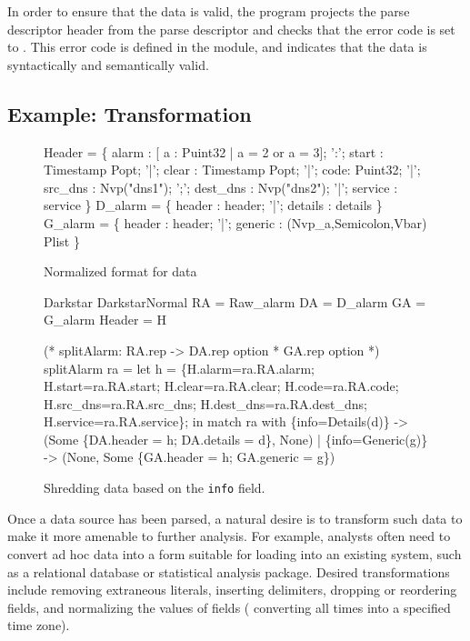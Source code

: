 In order to ensure that the data is valid, the program projects the
parse descriptor header from the parse descriptor  and checks
that the error code is set to .  This error code is defined
in the  module, and indicates that the data is syntactically
and semantically valid.

\subsection{Example: Transformation}
\label{sec:ex-trans}

\begin{figure}
  \centering
  \begin{code}\scriptsize
{} Header = \{
       alarm : [ a : Puint32 | a = 2 or a = 3];
 ':';  start :  Timestamp Popt;
 '|';  clear :  Timestamp Popt;
 '|';  code: Puint32;
 '|';  src\_dns  :  Nvp("dns1");
 ';';  dest\_dns :  Nvp("dns2");
 '|';  service  : service
\}
\mbox{}
 D\_alarm = \{
       header   : header;
 '|';  details  : details
 \}
\mbox{}
 G\_alarm = \{
       header   : header;
 '|';  generic  : (Nvp\_a,Semicolon,Vbar) Plist
\}\end{code}
\caption{Normalized format for \darkstar{} data}
\label{fig:normal-darkstar}
\end{figure}

\begin{figure}
\begin{code}\scriptsize
{} Darkstar
 DarkstarNormal
 RA = Raw\_alarm
 DA = D\_alarm
 GA = G\_alarm
 Header = H

(* splitAlarm: RA.rep -> DA.rep option * GA.rep option *)
 splitAlarm ra =
    let h = 
       \{H.alarm=ra.RA.alarm; H.start=ra.RA.start; 
         H.clear=ra.RA.clear; H.code=ra.RA.code;
         H.src\_dns=ra.RA.src\_dns; H.dest\_dns=ra.RA.dest\_dns;
         H.service=ra.RA.service\};
    in match ra with
        \{info=Details(d)\} -> 
        (Some \{DA.header = h; DA.details = d\}, None)
      | \{info=Generic(g)\} ->
        (None, Some \{GA.header = h; GA.generic = g\})    
  \end{code}
  \caption{Shredding \darkstar{} data based on the {\tt info} field.}
  \label{fig:ex-no-err-check}
\end{figure}

Once a data source has been parsed, a natural desire is to transform
such data to make it more amenable to further analysis.  For example,
analysts often need to convert ad hoc data into a form suitable for
loading into an existing system, such as a relational database or
statistical analysis package. Desired transformations include
removing extraneous literals, inserting delimiters, dropping or
reordering fields, and normalizing the values of fields (\eg{}
converting all times into a specified time zone).  

